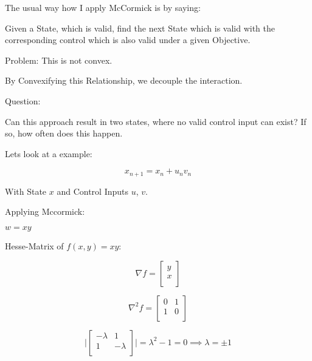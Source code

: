 The usual way how I apply McCormick is by saying:

Given a State, which is valid, find the next State which is valid with the
corresponding control which is also valid under a given Objective.

Problem: This is not convex.

By Convexifying this Relationship, we decouple the interaction.

Question:

Can this approach result in two states, where no valid control input can exist?
If so, how often does this happen.

Lets look at a example:

\[ x_{n+1} = x_{n} + u_{n} v_{n} \]

With State $x$ and Control Inputs $u$, $v$.

Applying Mccormick:

$w=xy$

\pagebreak

Hesse-Matrix of $f(x,y)=xy$:

\[
	\nabla f = \begin{bmatrix}
		y \\
		x \\
	\end{bmatrix}
\]

\[
	\nabla^2 f = \begin{bmatrix}
		0 & 1 \\
		1 & 0 \\
	\end{bmatrix}
\]

\[
	\vert \begin{bmatrix}
		-\lambda & 1        \\
		1        & -\lambda \\
	\end{bmatrix} \vert = \lambda^2-1 = 0 \implies \lambda=\pm1
\]

